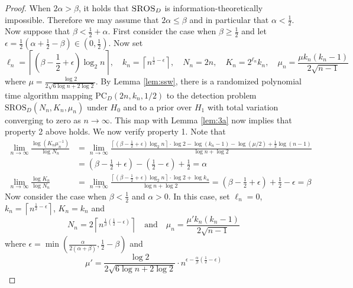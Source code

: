 \begin{proof}
When $2 \alpha > \beta$, it holds that $\textsc{SROS}_D$ is information-theoretically impossible. Therefore we may assume that $2\alpha \le \beta$ and in particular that $\alpha < \frac{1}{2}$. Now suppose that $\beta < \frac{1}{2} + \alpha$. First consider the case when $\beta \ge \frac{1}{2}$ and let $\epsilon = \frac{1}{2} \left( \alpha + \frac{1}{2} - \beta \right) \in \left( 0, \frac{1}{2} \right)$. Now set
$$\ell_n = \left\lceil \left( \beta - \frac{1}{2} + \epsilon \right) \log_2 n \right\rceil, \quad k_n = \left\lceil n^{\frac{1}{2} - \epsilon} \right\rceil,  \quad N_n = 2n,  \quad K_n = 2^{\ell_n} k_n,  \quad \mu_n =\frac{\mu k_n(k_n-1)}{2\sqrt{n - 1}}$$
where $\mu = \frac{\log 2}{2 \sqrt{6 \log n + 2\log 2}}$. By Lemma \ref{lem:ssw}, there is a randomized polynomial time algorithm mapping $\text{PC}_D(2n, k_n, 1/2)$ to the detection problem $\text{SROS}_D(N_n, K_n, \mu_n)$ under $H_0$ and to a prior over $H_1$ with total variation converging to zero as $n \to \infty$. This map with Lemma \ref{lem:3a} now implies that property 2 above holds. We now verify property 1. Note that
\begin{align*}
\lim_{n \to \infty} \frac{\log (K_n \mu_n^{-1})}{\log N_n} &= \lim_{n \to \infty} \frac{\left\lceil \left( \beta - \frac{1}{2} + \epsilon \right) \log_2 n \right\rceil \cdot \log 2 - \log(k_n - 1) - \log (\mu/2) + \frac{1}{2} \log(n - 1)}{\log n + \log 2} \\
&=  (\beta - \frac{1}{2} + \epsilon) - \left( \frac{1}{2} - \epsilon \right) + \frac{1}{2} = \alpha \\
\lim_{n \to \infty} \frac{\log K_n}{\log N_n} &= \lim_{n \to \infty} \frac{\left\lceil \left( \beta - \frac{1}{2} + \epsilon \right) \log_2 n \right\rceil \cdot \log 2 + \log k_n}{\log n + \log 2} = \left( \beta - \frac{1}{2} + \epsilon \right) + \frac{1}{2} - \epsilon = \beta
\end{align*}
Now consider the case when $\beta < \frac{1}{2}$ and $\alpha > 0$. In this case, set $\ell_n = 0$, $k_n = \left\lceil n^{\frac{1}{2} - \epsilon} \right\rceil$, $K_n = k_n$ and
$$N_n = 2\left\lceil n^{\frac{1}{\beta} \left( \frac{1}{2} - \epsilon \right)}\right\rceil \quad \text{and} \quad \mu_n =\frac{\mu' k_n(k_n-1)}{2\sqrt{n - 1}}$$
where $\epsilon = \min \left( \frac{\alpha}{2(\alpha + \beta)}, \frac{1}{2} - \beta \right)$ and
$$\mu' = \frac{\log 2}{2 \sqrt{6 \log n + 2\log 2}} \cdot n^{\epsilon - \frac{\alpha}{\beta} \left( \frac{1}{2} - \epsilon \right)}$$

\end{proof}
